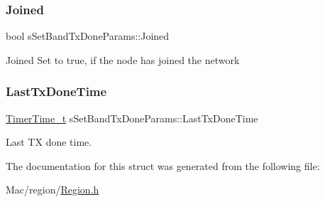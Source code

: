\subsubsection{\texorpdfstring{Joined}{Joined}}
{\footnotesize\ttfamily bool s\+Set\+Band\+Tx\+Done\+Params\+::\+Joined}

Joined Set to true, if the node has joined the network \mbox{\label{structsSetBandTxDoneParams_aa1a7b87e8778b47583ec8bfe02aabef4}} 
\subsubsection{\texorpdfstring{Last\+Tx\+Done\+Time}{LastTxDoneTime}}
{\footnotesize\ttfamily \hyperlink{utilities_8h_a4215ca43d3e953099ea758ce428599d0}{Timer\+Time\+\_\+t} s\+Set\+Band\+Tx\+Done\+Params\+::\+Last\+Tx\+Done\+Time}

Last TX done time. 

The documentation for this struct was generated from the following file\+:\begin{DoxyCompactItemize}
\item 
Mac/region/\hyperlink{Region_8h}{Region.\+h}\end{DoxyCompactItemize}
